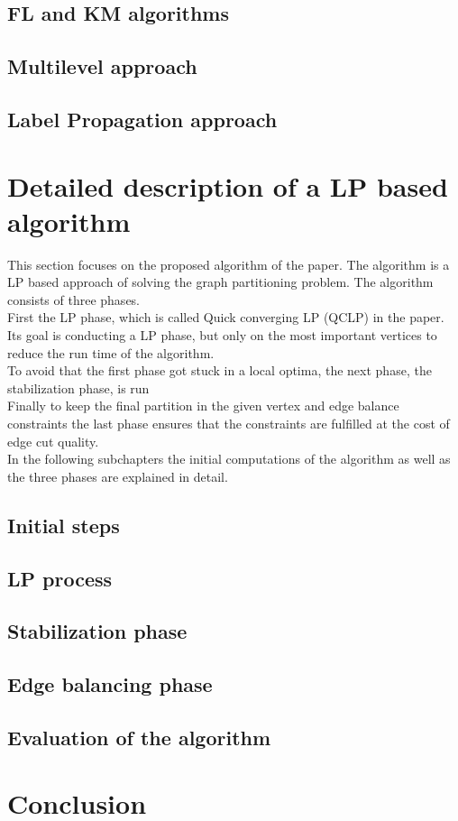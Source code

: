 \documentclass[acmsmall,nonacm,screen,review]{acmart}
\begin{document}
\subsection{FL and KM algorithms}
\subsection{Multilevel approach}
\subsection{Label Propagation approach}
\section{Detailed description of a LP based algorithm}
This section focuses on the proposed algorithm of the paper. The algorithm is a LP based approach of solving the graph partitioning problem. The algorithm consists of three phases.\\
First the LP phase, which is called Quick converging LP (QCLP) in the paper. Its goal is conducting a LP phase, but only on the most important vertices to reduce the run time of the algorithm.\\
To avoid that the first phase got stuck in a local optima, the next phase, the stabilization phase, is run\\
Finally to keep the final partition in the given vertex and edge balance constraints the last phase ensures that the constraints are fulfilled at the cost of edge cut quality.\\
In the following subchapters the initial computations of the algorithm as well as the three phases are explained in detail.
\subsection{Initial steps}
\subsection{LP process}
\subsection{Stabilization phase}
\subsection{Edge balancing phase}
\subsection{Evaluation of the algorithm}
\section{Conclusion}


\end{document}

